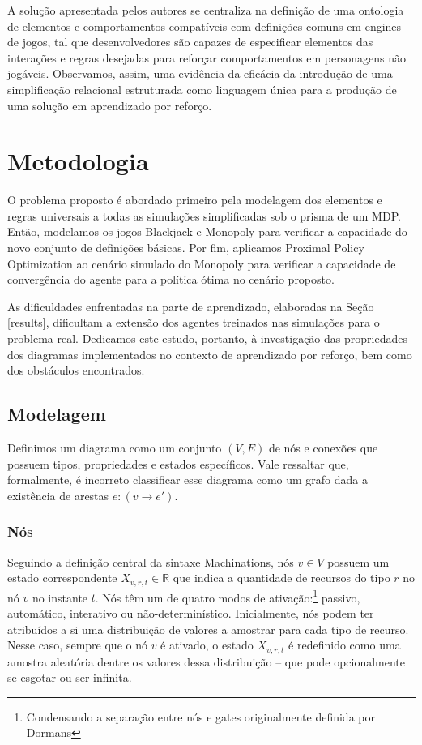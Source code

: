 \documentclass[conference]{IEEEtran}
\begin{document}
A solução apresentada pelos autores se centraliza na definição de uma ontologia de elementos e comportamentos compatíveis com definições comuns em engines de jogos, tal que desenvolvedores são capazes de especificar elementos das interações e regras desejadas para reforçar comportamentos em personagens não jogáveis. Observamos, assim, uma evidência da eficácia da introdução de uma simplificação relacional estruturada como linguagem única para a produção de uma solução em aprendizado por reforço.

\section{Metodologia}

O problema proposto é abordado primeiro pela modelagem dos elementos e regras universais a todas as simulações simplificadas sob o prisma de um MDP. Então, modelamos os jogos Blackjack e Monopoly para verificar a capacidade do novo conjunto de definições básicas. Por fim, aplicamos Proximal Policy Optimization\cite{ppo} ao cenário simulado do Monopoly para verificar a capacidade de convergência do agente para a política ótima no cenário proposto.

As dificuldades enfrentadas na parte de aprendizado, elaboradas na Seção \ref{results}, dificultam a extensão dos agentes treinados nas simulações para o problema real. Dedicamos este estudo, portanto, à investigação das propriedades dos diagramas implementados no contexto de aprendizado por reforço, bem como dos obstáculos encontrados.

\subsection{Modelagem}
\label{modeling}
Definimos um diagrama como um conjunto $(V, E)$ de nós e conexões que possuem tipos, propriedades e estados específicos. Vale ressaltar que, formalmente, é incorreto classificar esse diagrama como um grafo dada a existência de arestas $e:(v\rightarrow e')$.

\subsubsection{Nós}
Seguindo a definição central da sintaxe Machinations, nós $v \in V$ possuem um estado correspondente $X_{v,r,t} \in \mathbb{R}$ que indica a quantidade de recursos do tipo $r$ no nó $v$ no instante $t$. Nós têm um de quatro modos de ativação:\footnote{Condensando a separação entre nós e gates originalmente definida por Dormans} passivo, automático, interativo ou não-determinístico. Inicialmente, nós podem ter atribuídos a si uma distribuição de valores a amostrar para cada tipo de recurso. Nesse caso, sempre que o nó $v$ é ativado, o estado $X_{v,r,t}$ é redefinido como uma amostra aleatória dentre os valores dessa distribuição -- que pode opcionalmente se esgotar ou ser infinita.
\end{document}
